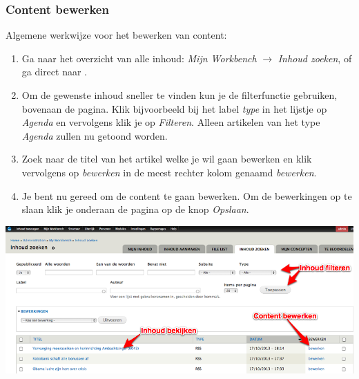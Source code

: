 \subsubsection{Content bewerken}\label{contentbewerken}
Algemene werkwijze voor het bewerken van content:
\begin{enumerate}
\item Ga naar het overzicht van alle inhoud: \emph{Mijn Workbench} $\rightarrow$ \emph{Inhoud zoeken}, of ga direct naar .
\item Om de gewenste inhoud sneller te vinden kun je de filterfunctie gebruiken, bovenaan de pagina. Klik bijvoorbeeld bij het label \emph{type} in het lijstje op \emph{Agenda} en vervolgens klik je op \emph{Filteren}. Alleen artikelen van het type \emph{Agenda} zullen nu getoond worden.
\item Zoek naar de titel van het artikel welke je wil gaan bewerken en klik vervolgens op \emph{bewerken} in de meest rechter kolom genaamd \emph{bewerken}.
\item Je bent nu gereed om de content te gaan bewerken. Om de bewerkingen op te slaan klik je onderaan de pagina op de knop \emph{Opslaan}.
\end{enumerate}

\begin{center}
	\includegraphics[width=\textwidth]{img/content2.png}
\end{center}

